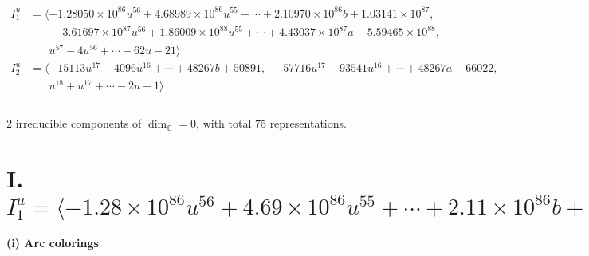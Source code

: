 \documentclass[1p]{elsarticle_modified}
\theoremstyle{definition}
\begin{document}
\begin{align*}
I^u_{1}&=\langle 
-1.28050\times10^{86} u^{56}+4.68989\times10^{86} u^{55}+\cdots+2.10970\times10^{86} b+1.03141\times10^{87},\\
\phantom{I^u_{1}}&\phantom{= \langle  }-3.61697\times10^{87} u^{56}+1.86009\times10^{88} u^{55}+\cdots+4.43037\times10^{87} a-5.59465\times10^{88},\\
\phantom{I^u_{1}}&\phantom{= \langle  }u^{57}-4 u^{56}+\cdots-62 u-21\rangle \\
I^u_{2}&=\langle 
-15113 u^{17}-4096 u^{16}+\cdots+48267 b+50891,\;-57716 u^{17}-93541 u^{16}+\cdots+48267 a-66022,\\
\phantom{I^u_{2}}&\phantom{= \langle  }u^{18}+u^{17}+\cdots-2 u+1\rangle \\
\\
\end{align*}
\raggedright * 2 irreducible components of $\dim_{\mathbb{C}}=0$, with total 75 representations.\\
\newpage
\renewcommand{\arraystretch}{1}
\centering \section*{I. $I^u_{1}= \langle -1.28\times10^{86} u^{56}+4.69\times10^{86} u^{55}+\cdots+2.11\times10^{86} b+1.03\times10^{87},\;-3.62\times10^{87} u^{56}+1.86\times10^{88} u^{55}+\cdots+4.43\times10^{87} a-5.59\times10^{88},\;u^{57}-4 u^{56}+\cdots-62 u-21 \rangle$}
\flushleft \textbf{(i) Arc colorings}\\
\end{document}
